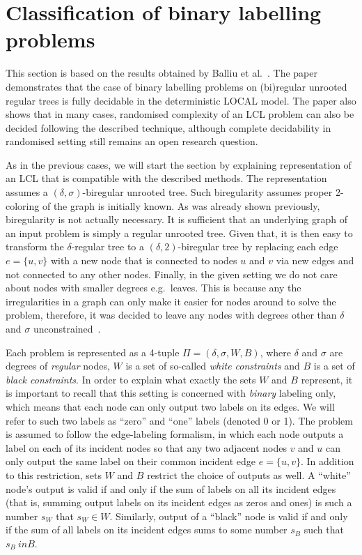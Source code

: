 \section{Classification of binary labelling problems}

This section is based on the results obtained by Balliu et al.~\cite{Balliu2019c}. The paper demonstrates
that the case of binary labelling problems on (bi)regular unrooted regular trees is fully decidable in
the deterministic LOCAL model. The paper also shows that in many cases, randomised complexity of an LCL problem
can also be decided following the described technique, although complete decidability in randomised setting
still remains an open research question.

As in the previous cases, we will start the section by explaining representation of an LCL that is compatible
with the described methods. The representation assumes a $(\delta, \sigma)$-biregular unrooted tree.
Such biregularity assumes proper 2-coloring of the graph is initially known.
As was already shown previously, biregularity is not actually necessary. It is
sufficient that an underlying graph of an input problem is simply a regular
unrooted tree. Given that, it is then easy to transform the $\delta$-regular tree
to a $(\delta, 2)$-biregular tree by replacing each edge $e = \{u, v\}$ with a new node that is
connected to nodes $u$ and $v$ via new edges and not connected to any other nodes. Finally,
in the given setting we do not care about nodes with smaller degrees e.g.\ leaves. This is
because any the irregularities in a graph can only make it easier for nodes around to solve
the problem, therefore, it was decided to leave any nodes with degrees other than $\delta$
and $\sigma$ unconstrained~\cite{Balliu2019c}.

Each problem is represented as a 4-tuple $\Pi = (\delta, \sigma, W, B)$, where
$\delta$ and $\sigma$ are degrees of \emph{regular} nodes, $W$ is a set of so-called
\emph{white constraints} and $B$ is a set of \emph{black constraints}. In order to
explain what exactly the sets $W$ and $B$ represent, it is important to recall that
this setting is concerned with \emph{binary} labeling only, which means that each node
can only output two labels on its edges. We will refer to such two labels as ``zero'' and ``one''
labels (denoted 0 or 1). The problem is assumed to follow the edge-labeling
formalism, in which each node outputs a label on each of its incident nodes so that
any two adjacent nodes $v$ and $u$ can only output the same label on their common
incident edge $e = \{u, v\}$. In addition to this restriction, sets $W$ and $B$
restrict the choice of outputs as well. A ``white'' node's output is valid
if and only if the sum of labels on all its incident edges (that is, summing
output labels on its incident edges as zeros and ones) is such a number $s_W$ that
$s_W \in W$. Similarly, output of a ``black'' node is valid if and only if
the sum of all labels on its incident edges sums to some number $s_B$ such that
$s_B \ in B$.

